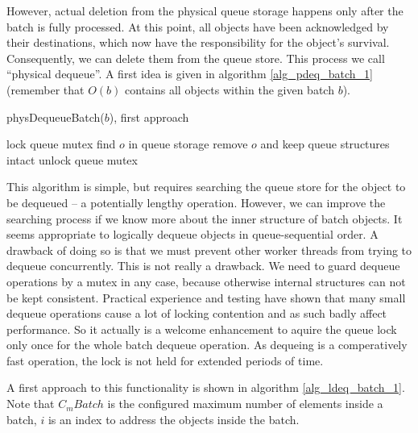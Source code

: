 \documentclass[a4paper,10pt]{article}
\begin{document}
However, actual deletion from the physical queue storage happens only after the batch is fully processed. At this point, all objects have been acknowledged by their destinations, which now have the responsibility for the object's survival. Consequently, we can delete them from the queue store. This process we call ``physical dequeue''. A first idea is given in algorithm \ref{alg_pdeq_batch_1} (remember that $O(b)$ contains all objects within the given batch $b$).

\begin{algorithm}
\caption{physDequeueBatch($b$), first approach}
\begin{algorithmic}
\label{alg_pdeq_batch_1}
\STATE lock queue mutex
	\STATE find $o$ in queue storage
	\STATE remove $o$ and keep queue structures intact
\ENDFOR
\STATE unlock queue mutex
\end{algorithmic}
\end{algorithm}

This algorithm is simple, but requires searching the queue store for the object to be dequeued -- a potentially lengthy operation. However, we can improve the searching process if we know more about the inner structure of batch objects. It seems appropriate to logically dequeue objects in queue-sequential order. A drawback of doing so is that we must prevent other worker threads from trying to dequeue concurrently. This is not really a drawback. We need to guard dequeue operations by a mutex in any case, because otherwise internal structures can not be kept consistent. Practical experience and testing have shown that many small dequeue operations cause a lot of locking contention and as such badly affect performance. So it actually is a welcome enhancement to aquire the queue lock only once for the whole batch dequeue operation. As dequeing is a comperatively fast operation, the lock is not held for extended periods of time.

A first approach to this functionality is shown in algorithm \ref{alg_ldeq_batch_1}. Note that $C_mBatch$ is the configured maximum number of elements inside a batch, $i$ is an index to address the objects inside the batch.
\end{document}
